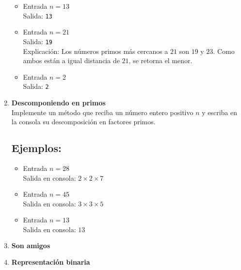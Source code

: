 \begin{enumerate}
\begin{itemize}
        \item Entrada \( n = 13 \)\\
        Salida: \texttt{13}
    
        \item Entrada \( n = 21 \)\\
        Salida: \texttt{19}\\
        Explicación:
        Los números primos más cercanos a \( 21 \) son \( 19 \) y \( 23 \). Como ambos están a igual distancia de \( 21 \), se retorna el menor.
    
        \item Entrada \( n = 2 \)\\
        Salida: \texttt{2}
    \end{itemize}
    

    \item \textbf{Descomponiendo en primos}\\
    Implemente un método que reciba un número entero positivo \( n \) y escriba en la consola su descomposición en factores primos.
    \subsection*{Ejemplos:}
    \begin{itemize}
        \item Entrada \( n = 28 \)\\
        Salida en consola: \( 2 \times 2 \times 7 \)
    
        \item Entrada \( n = 45 \)\\
        Salida en consola: \( 3 \times 3 \times 5 \)
    
        \item Entrada \( n = 13 \)\\
        Salida en consola: \( 13 \)
    \end{itemize}
    
    \item \textbf{Son amigos}\\
    

    \item \textbf{Representación binaria}
    
\end{enumerate}

\newpage
